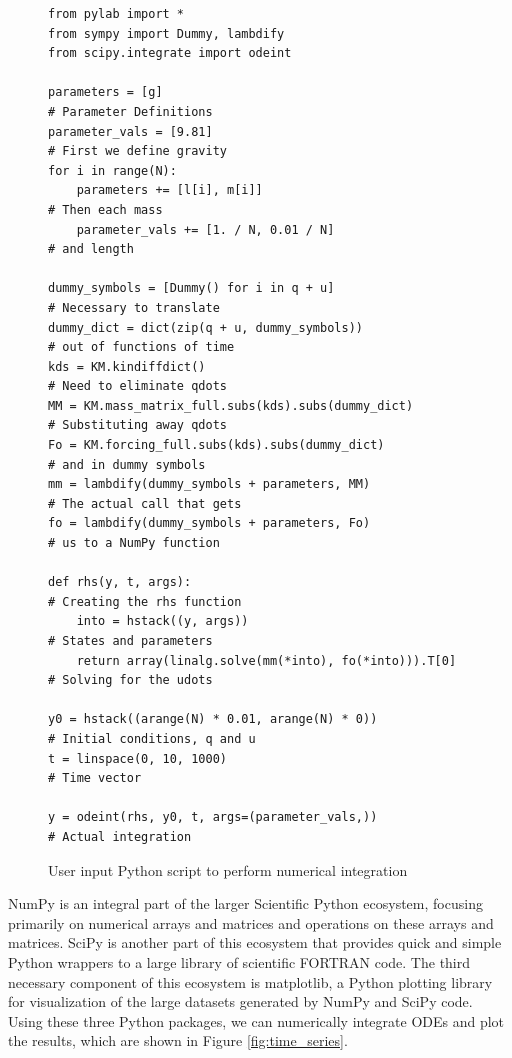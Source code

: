 \documentclass[twocolumn,10pt]{asme2e}
\begin{document}
\begin{figure}
\begin{Verbatim}[frame=single]
from pylab import *
from sympy import Dummy, lambdify
from scipy.integrate import odeint

parameters = [g]                                             # Parameter Definitions
parameter_vals = [9.81]                                      # First we define gravity
for i in range(N):
    parameters += [l[i], m[i]]                               # Then each mass
    parameter_vals += [1. / N, 0.01 / N]                     # and length

dummy_symbols = [Dummy() for i in q + u]                     # Necessary to translate
dummy_dict = dict(zip(q + u, dummy_symbols))                 # out of functions of time
kds = KM.kindiffdict()                                       # Need to eliminate qdots
MM = KM.mass_matrix_full.subs(kds).subs(dummy_dict)          # Substituting away qdots
Fo = KM.forcing_full.subs(kds).subs(dummy_dict)              # and in dummy symbols
mm = lambdify(dummy_symbols + parameters, MM)                # The actual call that gets
fo = lambdify(dummy_symbols + parameters, Fo)                # us to a NumPy function

def rhs(y, t, args):                                         # Creating the rhs function
    into = hstack((y, args))                                 # States and parameters
    return array(linalg.solve(mm(*into), fo(*into))).T[0]    # Solving for the udots

y0 = hstack((arange(N) * 0.01, arange(N) * 0))               # Initial conditions, q and u
t = linspace(0, 10, 1000)                                    # Time vector

y = odeint(rhs, y0, t, args=(parameter_vals,))               # Actual integration

\end{Verbatim}
\caption{User input Python script to perform numerical integration}
\label{fig:numerical_code}
\end{figure}

NumPy is an integral part of the larger Scientific Python ecosystem, focusing
primarily on numerical arrays and matrices and operations on these arrays and
matrices. SciPy is another part of this ecosystem that provides quick and
simple Python wrappers to a large library of scientific FORTRAN code. The third
necessary component of this ecosystem is matplotlib, a Python plotting library
for visualization of the large datasets generated by NumPy and SciPy code.
Using these three Python packages, we can numerically integrate ODEs and plot
the results, which are shown in Figure \ref{fig:time_series}.
\end{document}

